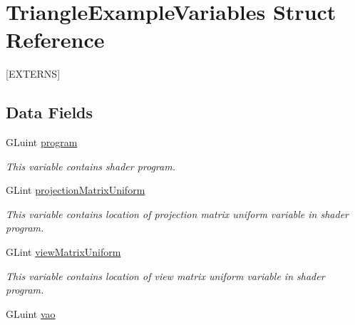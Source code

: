 \hypertarget{structTriangleExampleVariables}{\section{Triangle\-Example\-Variables Struct Reference}
\label{structTriangleExampleVariables}
}


\mbox{[}E\-X\-T\-E\-R\-N\-S\mbox{]}  


\subsection*{Data Fields}
\begin{DoxyCompactItemize}
\item 
\hypertarget{structTriangleExampleVariables_abc287e489a25d4e3c4ad1899d183881d}{G\-Luint \hyperlink{structTriangleExampleVariables_abc287e489a25d4e3c4ad1899d183881d}{program}}\label{structTriangleExampleVariables_abc287e489a25d4e3c4ad1899d183881d}

\begin{DoxyCompactList}\small\item\em This variable contains shader program. \end{DoxyCompactList}\item 
\hypertarget{structTriangleExampleVariables_a0215b92b36815394d6a4c8b5e3baa27a}{G\-Lint \hyperlink{structTriangleExampleVariables_a0215b92b36815394d6a4c8b5e3baa27a}{projection\-Matrix\-Uniform}}\label{structTriangleExampleVariables_a0215b92b36815394d6a4c8b5e3baa27a}

\begin{DoxyCompactList}\small\item\em This variable contains location of projection matrix uniform variable in shader program. \end{DoxyCompactList}\item 
\hypertarget{structTriangleExampleVariables_a94cf55d21d35fb4d0f85c1d7a49e6474}{G\-Lint \hyperlink{structTriangleExampleVariables_a94cf55d21d35fb4d0f85c1d7a49e6474}{view\-Matrix\-Uniform}}\label{structTriangleExampleVariables_a94cf55d21d35fb4d0f85c1d7a49e6474}

\begin{DoxyCompactList}\small\item\em This variable contains location of view matrix uniform variable in shader program. \end{DoxyCompactList}\item 
\hypertarget{structTriangleExampleVariables_a4230de13079947c4093b8d75ad1d5035}{G\-Luint \hyperlink{structTriangleExampleVariables_a4230de13079947c4093b8d75ad1d5035}{vao}}\label{structTriangleExampleVariables_a4230de13079947c4093b8d75ad1d5035}


\end{DoxyCompactItemize}

